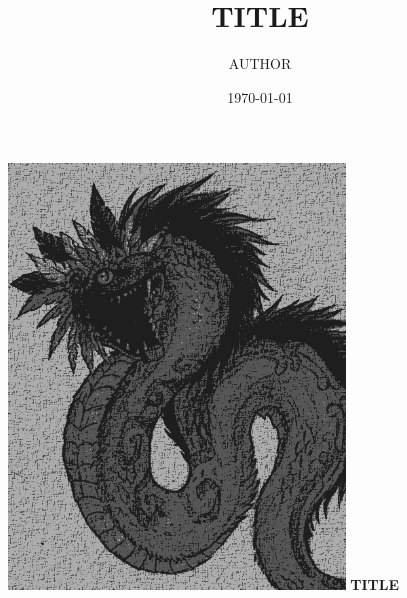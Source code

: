 \documentclass[kindle]{notex/notex}
\title{TITLE}
\author{AUTHOR}
\date{\today}
\begin{document}
\ifkindle
\begin{titlepage}
    \centering
    \vfill
    \includegraphics[height=113mm]{figures/feathered-serpent2.jpg}
    \vfill
    {\bfseries TITLE}
\end{titlepage}
\else
\maketitle
\fi

\tableofcontents


\end{document}

